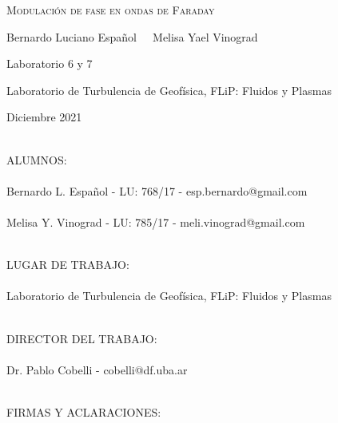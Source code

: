 \documentclass[../main.tex]{subfiles}
\begin{document}
\begin{titlepage}
\centering
\vspace{9cm}

{\scshape\Huge Modulación de fase en ondas de Faraday \par}

\vspace{1cm}
\vfill
{\Large Bernardo Luciano Español $~~~~~$Melisa Yael Vinograd \par}
\vfill
\vspace{8cm}

{\Large Laboratorio 6 y 7 \par}
{\large Laboratorio de Turbulencia de Geofísica, FLiP: Fluidos y Plasmas \par}
\vspace{1cm}
{\Large Diciembre 2021 \par}
\end{titlepage}

\begin{titlepage}
{\Large \ }\\
{\Large ALUMNOS:}\\
\vspace{0.1cm}\\
{\Large Bernardo L. Español - LU: 768/17 - esp.bernardo@gmail.com}\\\\
{\Large Melisa Y. Vinograd - LU: 785/17 - meli.vinograd@gmail.com}


\vspace{2cm}
{\Large \ }\\
{\Large LUGAR DE TRABAJO:}\\
\vspace{0.1cm}\\
{\Large Laboratorio de Turbulencia de Geofísica, FLiP: Fluidos y Plasmas}

\vspace{2cm}
{\Large \ }\\
{\Large DIRECTOR DEL TRABAJO:}\\
\vspace{0.1cm}\\
{\Large Dr. Pablo Cobelli - cobelli@df.uba.ar}

\vspace{2cm}
{\Large \ }\\
{\Large FIRMAS Y ACLARACIONES:}\\

\begin{figure}[ht]
 \hfill 	
\end{figure}


\end{titlepage}

\newpage
\end{document}

